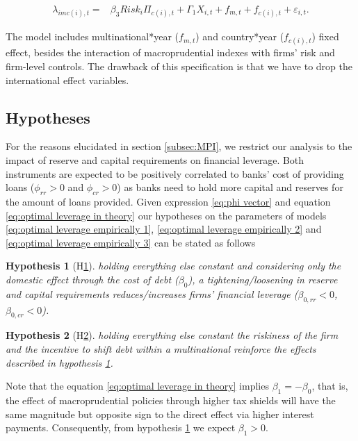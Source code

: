 \documentclass[12pt]{article}
\newtheorem{hyp}{Hypothesis}
\begin{document}
	\begin{equation}
	\begin{aligned}
	\lambda_{imc(i),t}=&\beta_3Risk_{i}\Pi_{c(i),t}+\Gamma_1 X_{i,t}+f_{m,t}+f_{c(i),t}+\varepsilon_{i,t}.
	\label{eq:optimal leverage empirically 3}
	\end{aligned}
	\end{equation}
	
	The model includes multinational*year ($f_{m,t}$) and country*year ($f_{c(i),t}$) fixed effect, besides the interaction of macroprudential indexes with firms' risk and firm-level controls. The drawback of this specification is that we have to drop the international effect variables. 		
	
		\subsection{Hypotheses}
	\label{subsec:hypothesis} 
	 For the reasons elucidated in section \ref{subsec:MPI}, we restrict our analysis to the impact of reserve and capital requirements on financial leverage. Both instruments are expected to be positively correlated to banks' cost of providing loans ($\phi_{rr}>0$ and $\phi_{cr}>0$) as banks need to hold more capital and reserves for the amount of loans provided. Given expression \ref{eq:phi vector} and equation 	\ref{eq:optimal leverage in theory} our hypotheses on the parameters of models \ref{eq:optimal leverage empirically 1}, \ref{eq:optimal leverage empirically 2} and \ref{eq:optimal leverage empirically 3} can be stated as follows

	\begin{hyp}[H\ref{hyp:H1}] \label{hyp:H1}
		holding everything else constant and considering only the domestic effect through the cost of debt ($\beta_{0}$), a tightening/loosening in reserve and capital requirements reduces/increases firms' financial leverage ($\beta_{0,rr}<0$, $\beta_{0,cr}<0$).
	\end{hyp}
	\begin{hyp}[H\ref{hyp:H2}] \label{hyp:H2}
		holding everything else constant the riskiness of the firm and the incentive to shift debt within a multinational reinforce the effects described in hypothesis \ref{hyp:H1}. 
	\end{hyp}
Note that the equation \ref{eq:optimal leverage in theory} implies $\beta_{1}=-\beta_{0}$, that is, the effect of macroprudential policies through higher tax shields will have the same magnitude but opposite sign to the direct effect via higher interest payments. Consequently, from hypothesis \ref{hyp:H1} we expect $\beta_{1}>0$. 
	 
\end{document}
